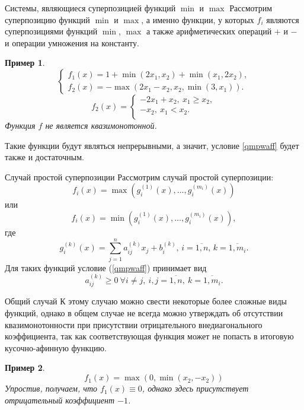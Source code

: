 \documentclass[envcountsect]{beamer}
\newtheorem*{ruexample}{Пример}
\theoremstyle{definition}
\begin{document}
	\begin{frame}{Системы, являющиеся суперпозицией функций \(\min\) и \(\max\)}
		Рассмотрим суперпозицию функций \(\min\) и \(\max\), а именно функции, у которых \(f_i\) являются суперпозициями функций \(\min\), \(\max\) а также арифметических операций \(+\) и \(-\) и операции умножения на константу.
		\begin{ruexample}
			\[\begin{cases}
				f_1(x) = 1 + \min(2x_1,x_2) + \min(x_1, 2x_2), \\
				f_2(x) = -\max(2x_1 - x_2, x_2, \min(3, x_1)).
			\end{cases}\]
			\[
			f_2(x) = \begin{cases}
				-2x_1 + x_2,\ x_1 \ge x_2,\\
				-x_2,\ x_1 < x_2. \\
			\end{cases}
			\]
			Функция \(f\) не является квазимонотонной.
		\end{ruexample}
		Такие функции будут являться непрерывными, а значит, условие \ref{qmpwaff} будет также и достаточным. 
	\end{frame}
	
	\begin{frame}{Случай простой суперпозиции}
		Рассмотрим случай простой суперпозиции:
		\[f_i(x) = \max(g_i^{(1)}(x),\dots,g_i^{(m_i)}(x))\]
		или
		\[f_i(x) = \min(g_i^{(1)}(x),\dots,g_i^{(m_i)}(x)),\]
		где
		\[g_i^{(k)}(x) = \sum_{j=1}^n a_{ij}^{(k)} x_j + b_i^{(k)},\, i = \overline{1, n},\, k = \overline{1, m_i}.\]
		Для таких функций условие (\ref{qmpwaff}) принимает вид
		\begin{equation} \label{qmmm}
			a_{ij}^{(k)} \ge 0\ \forall i \neq j,\ i,j = \overline{1, n},\ k = \overline{1, m_i}.
		\end{equation}
	\end{frame}
	
	\begin{frame}{Общий случай}
		К этому случаю можно свести некоторые более сложные виды функций, однако в общем случае не всегда можно утверждать об отсутствии квазимонотонности при присутствии отрицательного внедиагонального коэффициента, так как соответствующая функция может не попасть в итоговую кусочно-афинную функцию.
		\begin{ruexample}
			\[f_1(x) = \max(0, \min(x_2, -x_2))\]
			Упростив, получаем, что \(f_1(x) \equiv 0\), однако здесь присутствует отрицательный коэффициент \(-1\).
		\end{ruexample}
	\end{frame}
	
\end{document}

